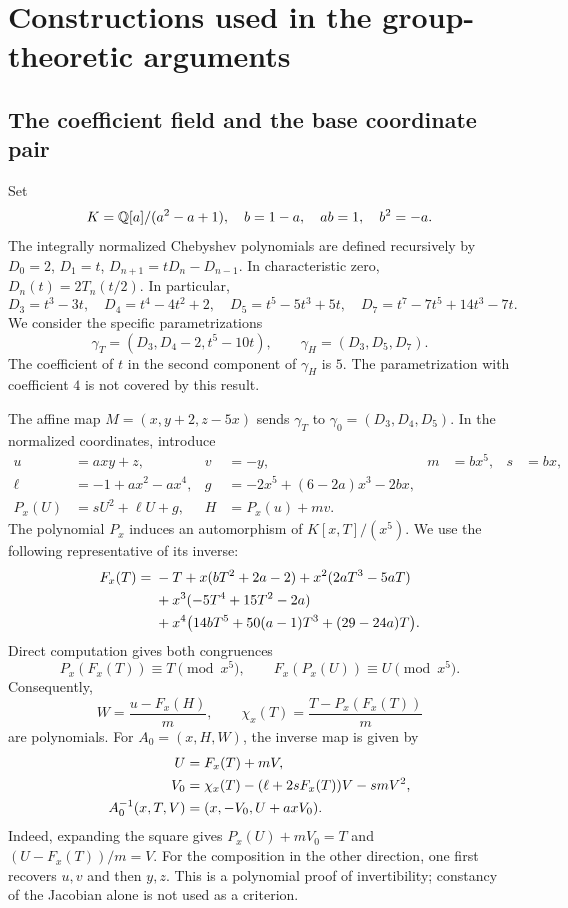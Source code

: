 \section{Constructions used in the group-theoretic arguments}\label{sec:constructions}

\subsection{The coefficient field and the base coordinate pair}
Set
\[
 K={\mathbb Q}[a]/(a^2-a+1),\quad b=1-a,\quad ab=1,\quad b^2=-a.
\]
The integrally normalized Chebyshev polynomials are defined recursively by
$D_0=2$, $D_1=t$, $D_{n+1}=tD_n-D_{n-1}$. In characteristic zero,
$D_n(t)=2T_n(t/2)$. In particular,
\[
 D_3=t^3-3t,\quad D_4=t^4-4t^2+2,\quad D_5=t^5-5t^3+5t,
\quad D_7=t^7-7t^5+14t^3-7t.
\]
We consider the specific parametrizations
\[
 \gamma_T=(D_3,D_4-2,t^5-10t),\qquad
 \gamma_H=(D_3,D_5,D_7).
\]
The coefficient of $t$ in the second component of $\gamma_H$ is $5$.
The parametrization with coefficient $4$ is not covered by this result.

The affine map $M=(x,y+2,z-5x)$ sends $\gamma_T$ to
$\gamma_0=(D_3,D_4,D_5)$. In the normalized coordinates, introduce
\begin{align*}
 u&=axy+z,&v&=-y,&m&=bx^5,&s&=bx,\\
 \ell&=-1+ax^2-ax^4,&
 g&=-2x^5+(6-2a)x^3-2bx,\\
 P_x(U)&=sU^2+\ell U+g,&H&=P_x(u)+mv.
\end{align*}
The polynomial $P_x$ induces an automorphism of $K[x,T]/(x^5)$.
We use the following representative of its inverse:
\begin{align}
 F_x(T)={}&-T+x(bT^2+2a-2)+x^2(2aT^3-5aT)\notag\\
 &+x^3(-5T^4+15T^2-2a)\notag\\
 &+x^4\bigl(14bT^5+50(a-1)T^3+(29-24a)T\bigr).
 \label{eq:inverse-mod-five}
\end{align}
Direct computation gives both congruences
\[
 P_x(F_x(T))\equiv T\pmod{x^5},\qquad
 F_x(P_x(U))\equiv U\pmod{x^5}.
\]
Consequently,
\[
 W=\frac{u-F_x(H)}m,\qquad
 \chi_x(T)=\frac{T-P_x(F_x(T))}m
\]
are polynomials. For $A_0=(x,H,W)$, the inverse map is given by
\begin{align}
 U&=F_x(T)+mV,\notag\\
 V_0&=\chi_x(T)-(\ell+2sF_x(T))V-smV^2,\notag\\
 A_0^{-1}(x,T,V)&=(x,-V_0,U+axV_0).\label{eq:base-inverse}
\end{align}
Indeed, expanding the square gives $P_x(U)+mV_0=T$ and
$(U-F_x(T))/m=V$. For the composition in the other direction, one first
recovers $u,v$ and then $y,z$. This is a polynomial proof of invertibility;
constancy of the Jacobian alone is not used as a criterion.

